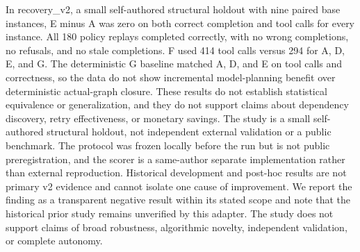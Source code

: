 \documentclass{article}
\begin{document}
In recovery\_v2, a small self-authored structural holdout with nine paired base instances, E minus A was zero on both correct completion and tool calls for every instance. All 180 policy replays completed correctly, with no wrong completions, no refusals, and no stale completions. F used 414 tool calls versus 294 for A, D, E, and G. The deterministic G baseline matched A, D, and E on tool calls and correctness, so the data do not show incremental model-planning benefit over deterministic actual-graph closure. These results do not establish statistical equivalence or generalization, and they do not support claims about dependency discovery, retry effectiveness, or monetary savings. The study is a small self-authored structural holdout, not independent external validation or a public benchmark. The protocol was frozen locally before the run but is not public preregistration, and the scorer is a same-author separate implementation rather than external reproduction. Historical development and post-hoc results are not primary v2 evidence and cannot isolate one cause of improvement. We report the finding as a transparent negative result within its stated scope and note that the historical prior study remains unverified by this adapter. The study does not support claims of broad robustness, algorithmic novelty, independent validation, or complete autonomy.




\end{document}

